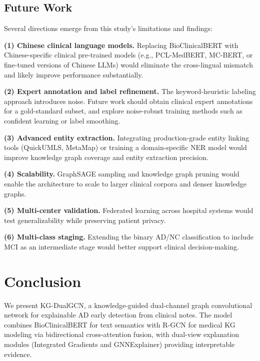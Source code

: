\documentclass[11pt,onecolumn,a4paper]{article}
\begin{document}
\subsection{Future Work}

Several directions emerge from this study's limitations and findings:

\textbf{(1) Chinese clinical language models.} Replacing BioClinicalBERT with Chinese-specific clinical pre-trained models (e.g., PCL-MedBERT, MC-BERT, or fine-tuned versions of Chinese LLMs) would eliminate the cross-lingual mismatch and likely improve performance substantially.

\textbf{(2) Expert annotation and label refinement.} The keyword-heuristic labeling approach introduces noise. Future work should obtain clinical expert annotations for a gold-standard subset, and explore noise-robust training methods such as confident learning or label smoothing.

\textbf{(3) Advanced entity extraction.} Integrating production-grade entity linking tools (QuickUMLS, MetaMap) or training a domain-specific NER model would improve knowledge graph coverage and entity extraction precision.

\textbf{(4) Scalability.} GraphSAGE sampling and knowledge graph pruning would enable the architecture to scale to larger clinical corpora and denser knowledge graphs.

\textbf{(5) Multi-center validation.} Federated learning across hospital systems would test generalizability while preserving patient privacy.

\textbf{(6) Multi-class staging.} Extending the binary AD/NC classification to include MCI as an intermediate stage would better support clinical decision-making.

\section{Conclusion}\label{sec:conclusion}

We present KG-DualGCN, a knowledge-guided dual-channel graph convolutional network for explainable AD early detection from clinical notes. The model combines BioClinicalBERT for text semantics with R-GCN for medical KG modeling via bidirectional cross-attention fusion, with dual-view explanation modules (Integrated Gradients and GNNExplainer) providing interpretable evidence.
\end{document}
